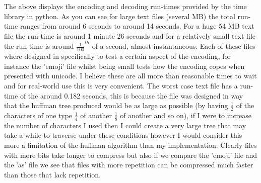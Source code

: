 \documentclass{mm2}
\begin{document}
The above displays the encoding and decoding run-times provided by the time library in python. As you can see for large text files (several MB) the total run-time ranges from around 6 seconds to around 14 seconds. For a huge 54 MB text file the run-time is around 1 minute 26 seconds and for a relatively small text file the run-time is around $\frac{1}{100}^{th}$ of a second, almost instantaneous. Each of these files where designed in specifically to test a certain aspect of the encoding, for instance the 'emoji' file whilst being small tests how the encoding copes when presented with unicode. I believe these are all more than reasonable times to wait and for real-world use this is very convenient. The worst case text file has a run-time of the around 0.182 seconds, this is because the file was designed in way that the huffman tree produced would be as large as possible (by having $\frac{1}{2}$ of the characters of one type $\frac{1}{4}$ of another $\frac{1}{8}$ of another and so on), if I were to increase the number of characters I used then I could create a very large tree that may take a while to traverse under these conditions however I would consider this more a limitation of the huffman algorithm than my implementation. Clearly files with more bits take longer to compress but also if we compare the 'emoji' file and the 'as' file we see that files with more repetition can be compressed much faster than those that lack repetition.
\end{document}
